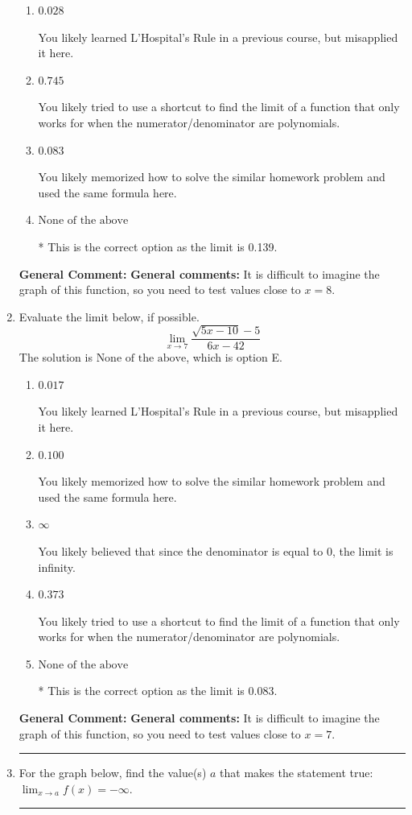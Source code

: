 \documentclass{extbook}[14pt]
\newcommand{\litem}[1]{\item #1

\rule{\textwidth}{0.4pt}}
\begin{document}
\begin{enumerate}
{\begin{enumerate}[label=\Alph*.]
You likely believed that since the denominator is equal to 0, the limit is infinity.
\item \( 0.028 \)

You likely learned L'Hospital's Rule in a previous course, but misapplied it here.
\item \( 0.745 \)

You likely tried to use a shortcut to find the limit of a function that only works for when the numerator/denominator are polynomials.
\item \( 0.083 \)

You likely memorized how to solve the similar homework problem and used the same formula here.
\item \( \text{None of the above} \)

* This is the correct option as the limit is 0.139.
\end{enumerate}

\textbf{General Comment:} \textbf{General comments:} It is difficult to imagine the graph of this function, so you need to test values close to $x = 8$.
}
\litem{
Evaluate the limit below, if possible.
\[ \lim_{x \rightarrow 7} \frac{\sqrt{5x - 10} - 5}{6x - 42} \]The solution is \( \text{None of the above} \), which is option E.\begin{enumerate}[label=\Alph*.]
\item \( 0.017 \)

You likely learned L'Hospital's Rule in a previous course, but misapplied it here.
\item \( 0.100 \)

You likely memorized how to solve the similar homework problem and used the same formula here.
\item \( \infty \)

You likely believed that since the denominator is equal to 0, the limit is infinity.
\item \( 0.373 \)

You likely tried to use a shortcut to find the limit of a function that only works for when the numerator/denominator are polynomials.
\item \( \text{None of the above} \)

* This is the correct option as the limit is 0.083.
\end{enumerate}

\textbf{General Comment:} \textbf{General comments:} It is difficult to imagine the graph of this function, so you need to test values close to $x = 7$.
}
\litem{
For the graph below, find the value(s) $a$ that makes the statement true: $ \displaystyle \lim_{x \rightarrow a} f(x) = -\infty$.

}
\end{enumerate}
\end{document}

